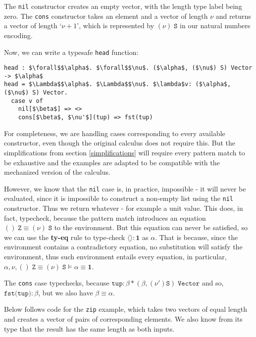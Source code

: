The \texttt{nil} constructor creates an empty vector, with the length type label being zero. 
The \texttt{cons} constructor takes an element and a vector of length $\nu$ and returns a vector of length `$\nu + 1$', which is represented by $(\nu) \; \texttt{S}$ in our natural numbers encoding.

Now, we can write a typesafe \texttt{head} function:

\begin{lstlisting}[mathescape=true, basicstyle=\ttfamily]
head : $\forall$$\alpha$. $\forall$$\nu$. ($\alpha$, ($\nu$) S) Vector -> $\alpha$
head = $\Lambda$$\alpha$. $\Lambda$$\nu$. $\lambda$v: ($\alpha$, ($\nu$) S) Vector.
  case v of
    nil[$\beta$] => <>
    cons[$\beta$, $\nu'$](tup) => fst(tup)
\end{lstlisting}

For completeness, we are handling cases corresponding to every available constructor, even though the original calculus does not require this. But the simplifications from section \ref{simplifications} will require every pattern match to be exhaustive and the examples are adapted to be compatible with the mechanized version of the calculus. 

However, we know that the \texttt{nil} case is, in practice, impossible - it will never be evaluated, since it is impossible to construct a non-empty list using the \texttt{nil} constructor. Thus we return whatever - for example a unit value. This does, in fact, typecheck, because the pattern match introduces an equation $() \; \texttt{Z} \equiv (\nu) \; \texttt{S}$ to the environment. But this equation can never be satisfied, so we can use the \textbf{ty-eq} rule to type-check $\langle\rangle : \mathbf{1}$ as $\alpha$. That is because, since the environment contains a contradictory equation, no substitution will satisfy the environment, thus such environment entails every equation, in particular, $\alpha, \nu, () \; \texttt{Z} \equiv (\nu) \; \texttt{S} \vDash \alpha \equiv \mathbf{1}$.

The \texttt{cons} case typechecks, because $\texttt{tup} : \beta * (\beta, (\nu') \texttt{S}) \; \texttt{Vector}$ and so, $\texttt{fst(tup)} : \beta$, but we also have $\beta \equiv \alpha$.

Below follows code for the \texttt{zip} example, which takes two vectors of equal length and creates a vector of pairs of corresponding elements. We also know from its type that the result has the same length as both inputs.

